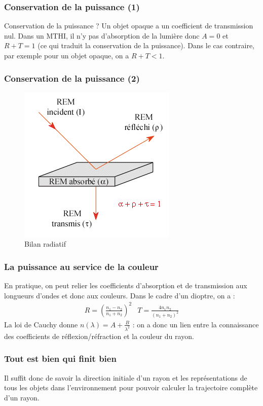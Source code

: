 \documentclass{beamercours}
\begin{document}
\begin{frame}
\frametitle{Conservation de la puissance (1)}
\begin{remarque}{Conservation de la puissance ?}{}
	Un objet opaque a un coefficient de transmission nul.
	Dans un MTHI, il n'y pas d'absorption de la lumière donc $A = 0$ et $R + T = 1$ (ce qui traduit la conservation de la puissance).
	Dans le cas contraire, par exemple pour un objet opaque, on a $R + T < 1$.
\end{remarque}
\end{frame}
\begin{frame}
\frametitle{Conservation de la puissance (2)}
\begin{figure}[H]
\centering
\includegraphics[scale=.4]{BilanRadiatif.png}
\caption{Bilan radiatif}
\end{figure}

\end{frame}

\begin{frame}
\frametitle{La puissance au service de la couleur}
En pratique, on peut relier les coefficients d'absorption et de transmission aux longueurs d'ondes et donc aux couleurs. Dans le cadre d'un dioptre, on a :
$$\begin{array}{cc}
R = \left(\frac{n_1-n_2}{n_1+n_2}\right)^2 & T = \frac{4n_1n_2}{(n_1+n_2)^2}
\end{array}$$
La loi de Cauchy donne $n(\lambda) = A + \frac{B}{\lambda^2}$ : on a donc un lien entre la connaissance des coefficients de réflexion/réfraction et la couleur du rayon.
\end{frame}
\begin{frame}
\frametitle{Tout est bien qui finit bien}
Il suffit donc de savoir la direction initiale d'un rayon et les représentations de tous les objets dans l'environnement pour pouvoir calculer la trajectoire complète d'un rayon.
\end{frame}
\end{document}
